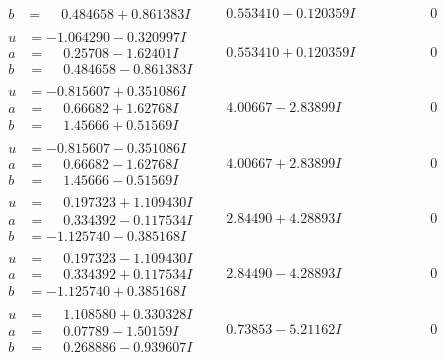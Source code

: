 \documentclass[1p]{elsarticle_modified}
\theoremstyle{definition}
\begin{document}
$$\begin{array}{c|c|c}
\begin{aligned}
b &= \phantom{-}0.484658 + 0.861383 I\end{aligned}
 & \phantom{-}0.553410 - 0.120359 I & \phantom{-0.000000 } 0 \\ \hline\begin{aligned}
u &= -1.064290 - 0.320997 I \\
a &= \phantom{-}0.25708 - 1.62401 I \\
b &= \phantom{-}0.484658 - 0.861383 I\end{aligned}
 & \phantom{-}0.553410 + 0.120359 I & \phantom{-0.000000 } 0 \\ \hline\begin{aligned}
u &= -0.815607 + 0.351086 I \\
a &= \phantom{-}0.66682 + 1.62768 I \\
b &= \phantom{-}1.45666 + 0.51569 I\end{aligned}
 & \phantom{-}4.00667 - 2.83899 I & \phantom{-0.000000 } 0 \\ \hline\begin{aligned}
u &= -0.815607 - 0.351086 I \\
a &= \phantom{-}0.66682 - 1.62768 I \\
b &= \phantom{-}1.45666 - 0.51569 I\end{aligned}
 & \phantom{-}4.00667 + 2.83899 I & \phantom{-0.000000 } 0 \\ \hline\begin{aligned}
u &= \phantom{-}0.197323 + 1.109430 I \\
a &= \phantom{-}0.334392 - 0.117534 I \\
b &= -1.125740 - 0.385168 I\end{aligned}
 & \phantom{-}2.84490 + 4.28893 I & \phantom{-0.000000 } 0 \\ \hline\begin{aligned}
u &= \phantom{-}0.197323 - 1.109430 I \\
a &= \phantom{-}0.334392 + 0.117534 I \\
b &= -1.125740 + 0.385168 I\end{aligned}
 & \phantom{-}2.84490 - 4.28893 I & \phantom{-0.000000 } 0 \\ \hline\begin{aligned}
u &= \phantom{-}1.108580 + 0.330328 I \\
a &= \phantom{-}0.07789 - 1.50159 I \\
b &= \phantom{-}0.268886 - 0.939607 I\end{aligned}
 & \phantom{-}0.73853 - 5.21162 I & \phantom{-0.000000 } 0 \\ \hline\begin{aligned}

\end{aligned}
\end{array}$$
\end{document}
